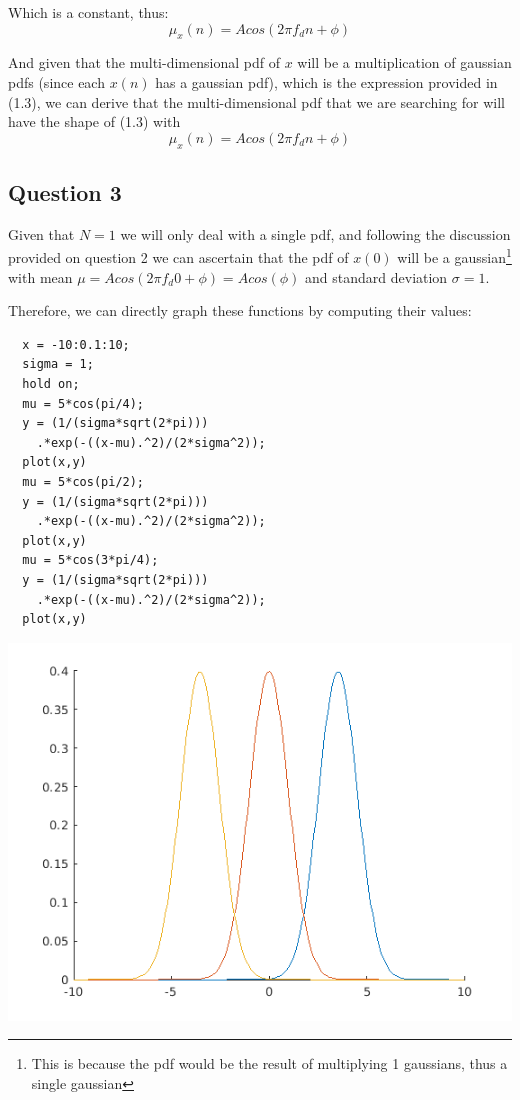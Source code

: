 \documentclass[conference,9pt]{IEEEtran}
\begin{document}
Which is a constant, thus:
$$\mu_x(n)=Acos(2\pi f_dn+\phi)$$

And given that the multi-dimensional pdf of $x$ will be a multiplication of gaussian pdfs (since each $x(n)$ has a gaussian pdf), which is the expression provided in (1.3), we can derive that the multi-dimensional pdf that we are searching for will have the shape of (1.3) with
$$\mu_x(n)=Acos(2\pi f_dn+\phi)$$

\subsection{Question 3}
Given that $N=1$ we will only deal with a single pdf, and following the discussion provided on question 2 we can ascertain that the pdf of $x(0)$ will be a gaussian\footnote{This is because the pdf would be the result of multiplying 1 gaussians, thus a single gaussian} with mean $\mu = Acos(2\pi f_d 0+\phi)=Acos(\phi)$ and standard deviation $\sigma=1$.

Therefore, we can directly graph these functions by computing their values:

\begin{verbatim}
  x = -10:0.1:10;
  sigma = 1;
  hold on;
  mu = 5*cos(pi/4);
  y = (1/(sigma*sqrt(2*pi)))
    .*exp(-((x-mu).^2)/(2*sigma^2));
  plot(x,y)
  mu = 5*cos(pi/2);
  y = (1/(sigma*sqrt(2*pi)))
    .*exp(-((x-mu).^2)/(2*sigma^2));
  plot(x,y)
  mu = 5*cos(3*pi/4);
  y = (1/(sigma*sqrt(2*pi)))
    .*exp(-((x-mu).^2)/(2*sigma^2));
  plot(x,y)
\end{verbatim}
\includegraphics[scale=0.6]{3}
\end{document}
